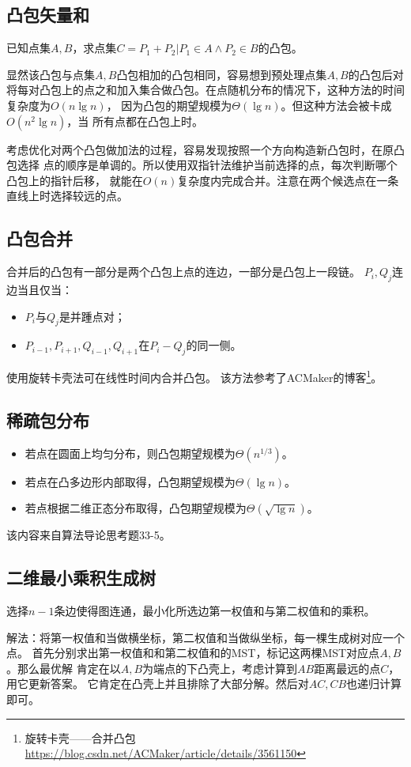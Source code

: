 \subsection{凸包矢量和}
已知点集$A,B$，求点集$C={P_1+P_2|P_1\in A \land P_2\in B}$的凸包。

显然该凸包与点集$A,B$凸包相加的凸包相同，容易想到预处理点集$A,B$的凸包后对
将每对凸包上的点之和加入集合做凸包。在点随机分布的情况下，这种方法的时间复杂度为$O(n \lg n)$，
因为凸包的期望规模为$\Theta(\lg n)$。但这种方法会被卡成$O(n^2 \lg n)$，当
所有点都在凸包上时。

考虑优化对两个凸包做加法的过程，容易发现按照一个方向构造新凸包时，在原凸包选择
点的顺序是单调的。所以使用双指针法维护当前选择的点，每次判断哪个凸包上的指针后移，
就能在$O(n)$复杂度内完成合并。注意在两个候选点在一条直线上时选择较远的点。
\subsection{凸包合并}
合并后的凸包有一部分是两个凸包上点的连边，一部分是凸包上一段链。
$P_i,Q_j$连边当且仅当：
\begin{itemize}
	\item $P_i$与$Q_j$是并踵点对；
	\item $P_{i-1},P_{i+1},Q_{i-1},Q_{i+1}$在$P_i-Q_j$的同一侧。
\end{itemize}
使用旋转卡壳法可在线性时间内合并凸包。
该方法参考了ACMaker的博客\footnote{
	旋转卡壳——合并凸包
	\url{https://blog.csdn.net/ACMaker/article/details/3561150}
}。
\subsection{稀疏包分布}
\begin{itemize}
	\item 若点在圆面上均匀分布，则凸包期望规模为$\Theta(n^{1/3})$。
	\item 若点在凸多边形内部取得，凸包期望规模为$\Theta(\lg n)$。
	\item 若点根据二维正态分布取得，凸包期望规模为$\Theta(\sqrt{\lg n})$。
\end{itemize}
该内容来自算法导论\cite{ITA3}思考题33-5。
\subsection{二维最小乘积生成树}
选择$n-1$条边使得图连通，最小化所选边第一权值和与第二权值和的乘积。

解法：将第一权值和当做横坐标，第二权值和当做纵坐标，每一棵生成树对应一个点。
首先分别求出第一权值和和第二权值和的MST，标记这两棵MST对应点$A,B$。那么最优解
肯定在以$A,B$为端点的下凸壳上，考虑计算到$AB$距离最远的点$C$，用它更新答案。
它肯定在凸壳上并且排除了大部分解。然后对$AC,CB$也递归计算即可。

